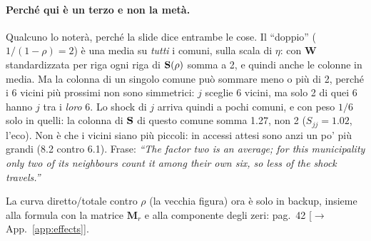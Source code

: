 \documentclass[11pt,a4paper]{article}
\newcommand{\app}[1]{{\small\color{navy}[$\to$ App.~\ref{#1}]}}
\newcommand{\bW}{\mathbf{W}}\newcommand{\bX}{\mathbf{X}}\newcommand{\bZ}{\mathbf{Z}}\newcommand{\by}{\mathbf{y}}
\begin{document}
\paragraph{Perché qui è un terzo e non la metà.} Qualcuno lo noterà, perché la slide dice entrambe le cose. Il ``doppio'' ($1/(1-\rho)=2$) è una media su \emph{tutti} i comuni, sulla scala di $\eta$: con $\bW$ standardizzata per riga ogni riga di $\mathbf{S}(\rho)$ somma a 2, e quindi anche le colonne in media. Ma la colonna di un singolo comune può sommare meno o più di 2, perché i 6 vicini più prossimi non sono simmetrici: $j$ sceglie 6 vicini, ma solo 2 di quei 6 hanno $j$ tra i \emph{loro} 6. Lo shock di $j$ arriva quindi a pochi comuni, e con peso $1/6$ solo in quelli: la colonna di $\mathbf{S}$ di questo comune somma 1.27, non 2 ($S_{jj}=1.02$, l'eco). Non è che i vicini siano più piccoli: in accessi attesi sono anzi un po' più grandi (8.2 contro 6.1). Frase: \emph{``The factor two is an average; for this municipality only two of its neighbours count it among their own six, so less of the shock travels.''}

La curva diretto/totale contro $\rho$ (la vecchia figura) ora è solo in backup, insieme alla formula con la matrice $\mathbf M_r$ e alla componente degli zeri: pag.~42 \app{app:effects}.
\end{document}
